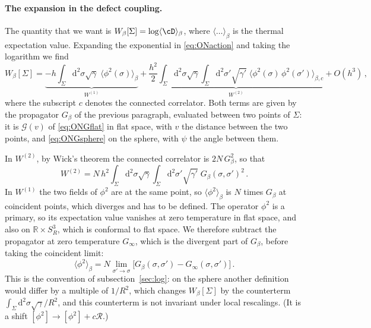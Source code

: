 \documentclass[a4paper,11pt]{article}
\newcommand{\dd}{\mathrm{d}}
\begin{document}
\paragraph{The expansion in the defect coupling.}
The quantity that we want is $W_\beta[\Sigma]=\log\langle\cD\rangle_\beta$, where $\langle\dots\rangle_\beta$ is the thermal expectation value. Expanding the exponential in \eqref{eq:ONaction} and taking the logarithm we find
\begin{equation}\label{eq:ONexp}
	W_\beta[\Sigma]=\underbrace{-h\int_\Sigma\dd^2\sigma\sqrt\gamma\;\langle\phi^2(\sigma)\rangle_\beta}_{W^{(1)}}
	+\underbrace{\frac{h^2}{2}\int_\Sigma\dd^2\sigma\sqrt\gamma\int_\Sigma\dd^2\sigma'\sqrt{\gamma'}\;\langle\phi^2(\sigma)\,\phi^2(\sigma')\rangle_{\beta,c}}_{W^{(2)}}+O(h^3)\, ,
\end{equation}
where the subscript $c$ denotes the connected correlator. Both terms are given by the propagator $G_\beta$ of the previous paragraph, evaluated between two points of $\Sigma$: it is $\mathcal{G}(v)$ of \eqref{eq:ONGflat} in flat space, with $v$ the distance between the two points, and \eqref{eq:ONGsphere} on the sphere, with $\psi$ the angle between them.

In $W^{(2)}$, by Wick's theorem the connected correlator is $2N\,G_\beta^2$, so that
\begin{equation}\label{eq:ONW12}
	W^{(2)}=N\,h^2\int_\Sigma\dd^2\sigma\sqrt\gamma\int_\Sigma\dd^2\sigma'\sqrt{\gamma'}\;G_\beta(\sigma,\sigma')^2\, .
\end{equation}
In $W^{(1)}$ the two fields of $\phi^2$ are at the same point, so $\langle\phi^2\rangle_\beta$ is $N$ times $G_\beta$ at coincident points, which diverges and has to be defined. The operator $\phi^2$ is a primary, so its expectation value vanishes at zero temperature in flat space, and also on $\mathbb{R}\times S^3_R$, which is conformal to flat space. We therefore subtract the propagator at zero temperature $G_\infty$, which is the divergent part of $G_\beta$, before taking the coincident limit:
\begin{equation}\label{eq:ONphi2def}
	\langle\phi^2\rangle_\beta=N\lim_{\sigma'\to\sigma}\bigl[G_\beta(\sigma,\sigma')-G_\infty(\sigma,\sigma')\bigr]\, .
\end{equation}
This is the convention of subsection~\ref{sec:log}: on the sphere another definition would differ by a multiple of $1/R^2$, which changes $W_\beta[\Sigma]$ by the counterterm $\int_\Sigma\dd^2\sigma\sqrt\gamma/R^2$, and this counterterm is not invariant under local rescalings. (It is a shift $[\phi^2] \to [\phi^2] + c \mathcal{R}$.)
\end{document}
